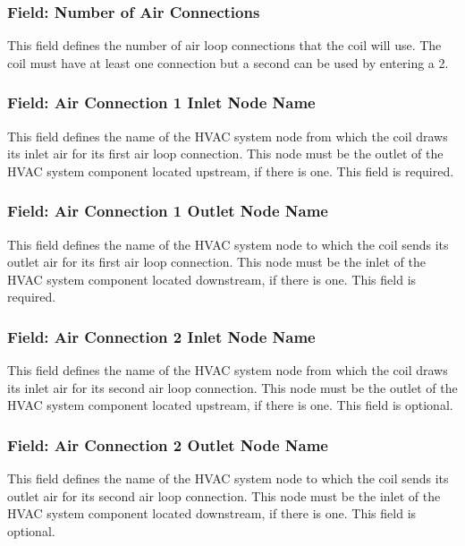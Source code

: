 \subsubsection{Field: Number of Air Connections}\label{field-number-of-air-connections}

This field defines the number of air loop connections that the coil will use. The coil must have at least one connection but a second can be used by entering a 2.

\subsubsection{Field: Air Connection 1 Inlet Node Name}\label{field-air-connection-1-inlet-node-name}

This field defines the name of the HVAC system node from which the coil draws its inlet air for its first air loop connection. This node must be the outlet of the HVAC system component located upstream, if there is one. This field is required.

\subsubsection{Field: Air Connection 1 Outlet Node Name}\label{field-air-connection-1-outlet-node-name}

This field defines the name of the HVAC system node to which the coil sends its outlet air for its first air loop connection. This node must be the inlet of the HVAC system component located downstream, if there is one. This field is required.

\subsubsection{Field: Air Connection 2 Inlet Node Name}\label{field-air-connection-2-inlet-node-name}

This field defines the name of the HVAC system node from which the coil draws its inlet air for its second air loop connection. This node must be the outlet of the HVAC system component located upstream, if there is one. This field is optional.

\subsubsection{Field: Air Connection 2 Outlet Node Name}\label{field-air-connection-2-outlet-node-name}

This field defines the name of the HVAC system node to which the coil sends its outlet air for its second air loop connection. This node must be the inlet of the HVAC system component located downstream, if there is one. This field is optional.

